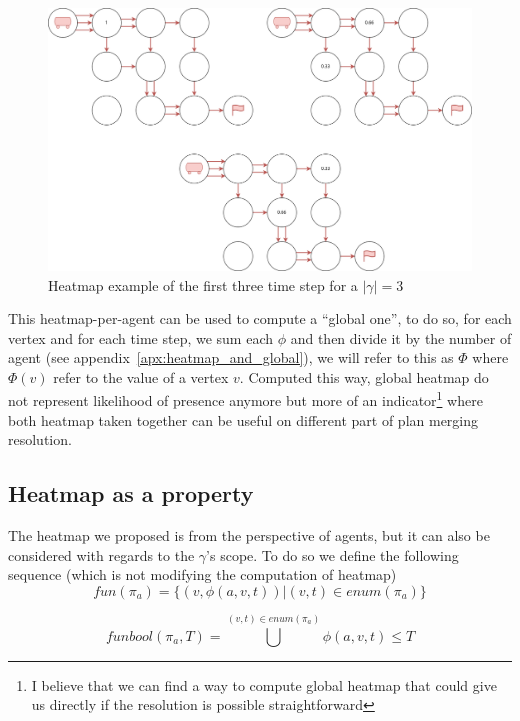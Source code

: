 \begin{figure}[H]
  \centering
  \caption{Heatmap example of the first three time step for a \(|\gamma|=3\) }\label{img:heatmap}
  \includegraphics[width=12cm]{img/heatmap.drawio.png}
\end{figure}

This heatmap-per-agent can be used to compute a ``global one'', to do so, for each vertex and for each time step, we sum each \(\phi\) and then divide it by the number of agent (see appendix~\ref{apx:heatmap_and_global}), we will refer to this as \(\Phi\) where \(\Phi(v)\) refer to the value of a vertex \(v\). Computed this way, global heatmap do not represent likelihood of presence anymore but more of an indicator\footnote{I believe that we can find a way to compute global heatmap that could give us directly if the resolution is possible straightforward} where both heatmap taken together can be useful on different part of plan merging resolution.

\subsection{Heatmap as a property}


The heatmap we proposed is from the perspective of agents, but it can also be considered with regards to the \(\gamma\)'s scope. To do so we define the following sequence (which is not modifying the computation of heatmap)
\[
  fun(\pi_a) = \{(v,\phi(a,v,t))| (v,t) \in enum(\pi_a)\} 
\]


\[
  funbool(\pi_a,T) = \bigcup^{(v,t) \in enum(\pi_a)}{ \phi(a,v,t) \leq T } 
\]

